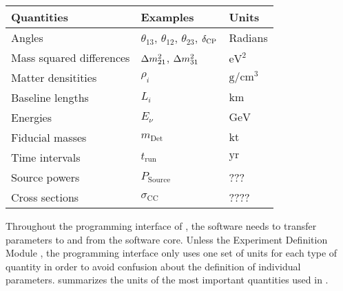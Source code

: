 \begin{table}[t]
\begin{center}
\begin{tabular}{lll}
\hline
Quantities & Examples & Units \\
\hline
Angles & $\theta_{13}$, $\theta_{12}$, $\theta_{23}$, $\delta_{\mathrm{CP}}$ & Radians  \\
Mass squared differences & $\Delta m_{21}^2$, $\Delta m_{31}^2$ & $\mathrm{eV}^2$ \\
Matter densitities & $\rho_i$ & $\mathrm{g}/\mathrm{cm}^3$ \\
Baseline lengths & $L_i$ & $\mathrm{km}$ \\
Energies & $E_\nu$ & $\mathrm{GeV}$ \\  
Fiducial masses & $m_{\mathrm{Det}}$ & $\mathrm{kt}$ \\
Time intervals & $t_{\mathrm{run}}$ & $\mathrm{yr}$ \\
Source powers & $P_{\mathrm{Source}}$ & ??? \\
Cross sections & $\sigma_{\mathrm{CC}}$ &  ???? \\
\hline
\end{tabular}
\end{center}
\end{table}

Throughout the programming interface of \GLOBES , the software needs to transfer parameters to and from the software core. Unless the Experiment Definition Module \EDM , the programming interface only uses one set of units for each type of quantity in order to avoid confusion about the definition of individual parameters.  summarizes the units of the most important quantities used in \GLOBES .

